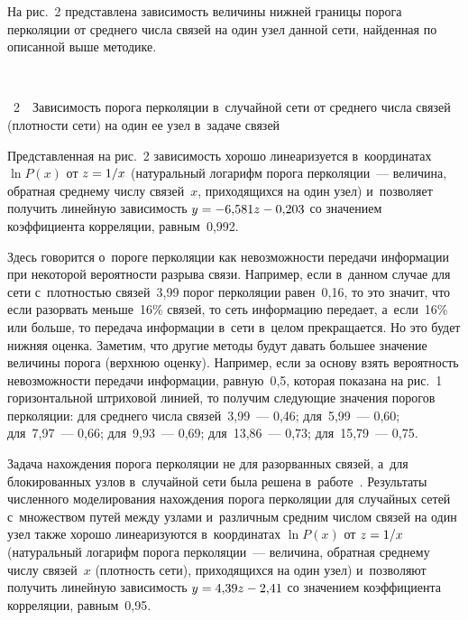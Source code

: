 \begin{multicols}{2}
  На рис.~2 пред\-став\-ле\-на зависимость величины нижней границы порога 
перколяции от среднего чис\-ла связей на один узел данной сети, найденная по 
описанной выше методике.

 { \begin{center}  %
 \vspace*{9pt}
  \mbox{%
 \epsfxsize=79mm 
 }


\end{center}

\vspace*{-6pt}


\noindent
{{\figurename~2}\ \ \small{Зависимость порога перколяции в~случайной сети от среднего чис\-ла 
связей (плот\-ности сети) на один ее узел в~задаче связей}}
}



  

  Представленная на рис.~2 зависимость хорошо линеаризуется 
в~координатах $\ln P(x)$ от $z\hm=1/x$ (натуральный логарифм 
порога перколяции~--- величина, обратная среднему чис\-лу связей~$x$, 
приходящихся на один узел) и~поз\-во\-ля\-ет получить линейную за\-ви\-си\-мость 
$y\hm= -6{,}581z\hm-0{,}203$ со значением коэффициента корреляции, 
рав\-ным~0,992. 
  
  Здесь говорится о~пороге перколяции как невозможности передачи 
информации при некоторой ве\-ро\-ят\-ности разрыва связи. Например, если 
в~данном случае для сети с~плот\-ностью связей~3,99 порог перколяции 
равен~0,16, то это значит, что если разорвать меньше~16\% связей, то сеть 
информацию передает, а~если~16\% или больше, то передача информации 
в~сети в~целом прекращается. Но это будет ниж\-няя оценка. Заметим, что 
другие методы будут давать большее значение величины порога (верхнюю 
оценку). Например, если за осно\-ву взять ве\-ро\-ят\-ность невозможности передачи 
информации, равную~0,5, которая показана на рис.~1 горизонтальной штриховой
линией, 
то получим сле\-ду\-ющие значения порогов перколяции: для среднего чис\-ла 
связей~3,99~--- 0,46; для~5,99~--- 0,60; для~7,97~--- 0,66; для~9,93~--- 0,69; 
для~13,86~--- 0,73; для~15,79~--- 0,75.



  
  Задача нахождения порога перколяции не для разорванных связей, а~для 
блокированных узлов в~случайной сети была решена в~работе~\cite{12-zh}. 
Результаты чис\-лен\-но\-го моделирования нахождения порога перколяции для 
случайных сетей с~множеством путей между узлами и~различным средним 
чис\-лом связей на один узел также хорошо линеаризуются в~координатах $\ln 
P(x)$ от $z\hm=1/x$ (натуральный логарифм порога 
пер\-ко\-ля\-ции~--- величина, обратная сред\-не\-му чис\-лу связей~$x$ (плот\-ность 
сети), приходящихся на один узел) и~позволяют получить линейную 
за\-ви\-си\-мость $y\hm=4{,}39z\hm-2{,}41$ со значением коэффициента 
корреляции, рав\-ным~0,95.
  

\end{multicols}
